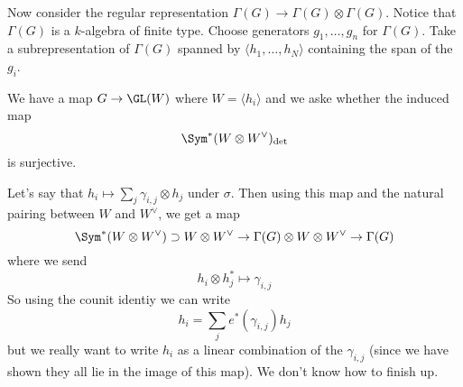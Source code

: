 \documentclass[12pt]{article}
\begin{document}
Now consider the regular representation $\Gamma(G)\to \Gamma(G)\otimes \Gamma(G)$. Notice that $\Gamma(G)$ is 
a $k$-algebra of finite type. Choose generators $g_1,\dots,g_n$ for $\Gamma(G)$. Take a subrepresentation of $\Gamma(G)$
spanned by $\langle h_1,\dots,h_N\rangle$ containing the span of the $g_i$.

We have a map $G\to \GL(W)$ where $W=\langle h_i\rangle$ and we aske whether the induced map 
\[\Sym^\ast(W\otimes W^\vee)_{\det}\]
is surjective.

Let's say that $h_i\mapsto \sum_j\gamma_{i,j}\otimes h_j$ under $\sigma$. Then using this map and the natural pairing between $W$ and $W^\vee$, we get a map 
\[\Sym^\ast(W\otimes W^\vee)\supset W\otimes W^\vee\to\Gamma(G)\otimes W\otimes W^\vee\to \Gamma(G)\]
where we send 
\[h_i\otimes h_j^\ast\mapsto \gamma_{i,j}\]
So using the counit identiy we can write 
\[h_i=\sum_j e^\ast(\gamma_{i,j})h_j\]
but we really want to write $h_i$ as a linear combination of the $\gamma_{i,j}$ (since we have shown they all lie in the image of this map).
We don't know how to finish up.
\end{document}
